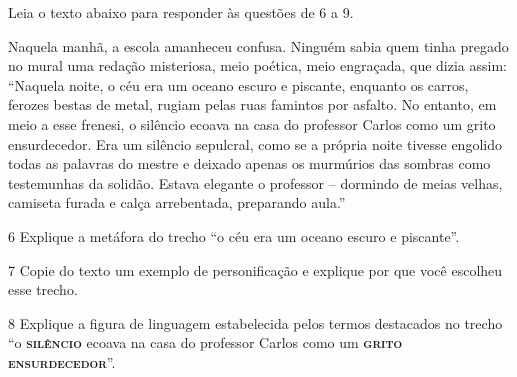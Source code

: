 

Leia o texto abaixo para responder às questões de 6 a 9.

\begin{myquote}

Naquela manhã, a escola amanheceu confusa. Ninguém sabia quem tinha pregado no
mural uma redação misteriosa, meio poética, meio engraçada, que dizia assim:
``Naquela noite, o céu era um oceano escuro e piscante, enquanto os carros, 
ferozes bestas de metal, rugiam pelas ruas famintos por asfalto. No entanto, 
em meio a esse frenesi, o silêncio ecoava na casa do professor Carlos como 
um grito ensurdecedor. Era um silêncio sepulcral, como se a própria noite 
tivesse engolido todas as palavras do mestre e deixado apenas os murmúrios 
das sombras como testemunhas da solidão. Estava elegante o professor -- 
dormindo de meias velhas, camiseta furada e calça arrebentada, preparando aula.''


\end{myquote}

\num{6} Explique a metáfora do trecho ``o céu era um oceano escuro e piscante''.


\num{7} Copie do texto um exemplo de personificação e explique por que você
escolheu esse trecho.


\num{8} Explique a figura de linguagem estabelecida pelos termos destacados no trecho 
``o \textsc{\textbf{silêncio}} ecoava na casa do professor Carlos como um 
\textsc{\textbf{grito ensurdecedor}}''.


